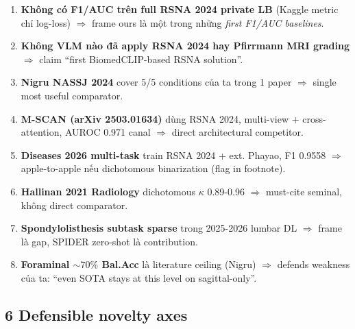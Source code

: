 \documentclass[11pt,a4paper]{article}
\begin{document}
\begin{enumerate}[leftmargin=*]
\item \textbf{Không có F1/AUC trên full RSNA 2024 private LB} (Kaggle
metric chỉ log-loss) $\Rightarrow$ frame ours là một trong những
\emph{first F1/AUC baselines}.
\item \textbf{Không VLM nào đã apply RSNA 2024 hay Pfirrmann MRI
grading} $\Rightarrow$ claim ``first BiomedCLIP-based RSNA solution''.
\item \textbf{Nigru NASSJ 2024} cover 5/5 conditions của ta trong 1
paper $\Rightarrow$ single most useful comparator.
\item \textbf{M-SCAN (arXiv 2503.01634)} dùng RSNA 2024, multi-view +
cross-attention, AUROC 0.971 canal $\Rightarrow$ direct architectural
competitor.
\item \textbf{Diseases 2026 multi-task} train RSNA 2024 + ext. Phayao,
F1 0.9558 $\Rightarrow$ apple-to-apple nếu dichotomous binarization
(flag in footnote).
\item \textbf{Hallinan 2021 Radiology} dichotomous $\kappa$ 0.89-0.96
$\Rightarrow$ must-cite seminal, không direct comparator.
\item \textbf{Spondylolisthesis subtask sparse} trong 2025-2026 lumbar
DL $\Rightarrow$ frame là gap, SPIDER zero-shot là contribution.
\item \textbf{Foraminal $\sim 70\%$ Bal.Acc} là literature ceiling
(Nigru) $\Rightarrow$ defends weakness của ta: ``even SOTA stays at
this level on sagittal-only''.
\end{enumerate}

\subsection{6 Defensible novelty axes}
\end{document}
